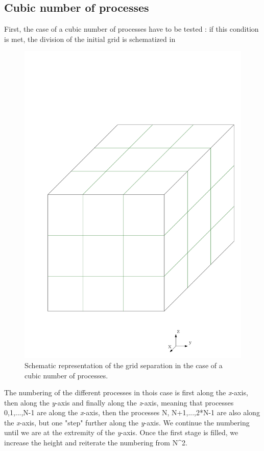 \documentclass[12 pt]{report}
\begin{document}
\subsection{Cubic number of processes}
First, the case of a cubic number of processes have to be tested : if this condition is met, the division of the initial grid is schematized in 
%
\begin{figure}
	\centering
	\includegraphics[scale=0.5]{MPI_cubic_division}
	\caption{Schematic representation of the grid separation in the case of a cubic number of processes.}
	\label{fig:CUBICSEPARATION}
\end{figure}
%
The numbering of the different processes in thois case is first along the \textit{x}-axis, then along the \textit{y}-axis and finally along the \textit{z}-axis, meaning that processes 0,1,...,N-1 are along the \textit{x}-axis, then the processes N, N+1,...,2*N-1 are also along the \textit{x}-axis, but one "step" further along the \textit{y}-axis. We continue the numbering until we are at the extremity of the \textit{y}-axis. Once the first stage is filled, we increase the height and reiterate the numbering from N^2.
\end{document}
